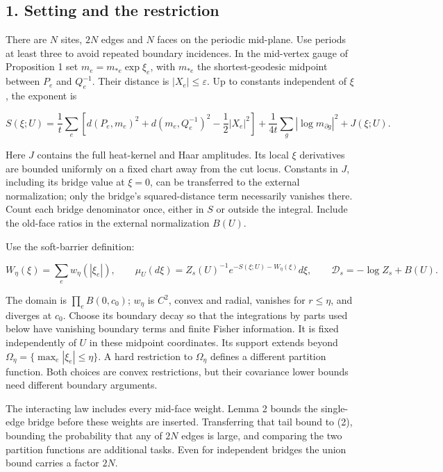 \documentclass[11pt,a4paper]{article}
\begin{document}
\hypertarget{setting-and-the-restriction}{%
\subsection{1. Setting and the
restriction}\label{setting-and-the-restriction}}

There are \(N\) sites, \(2N\) edges and \(N\) faces on the periodic
mid-plane. Use periods at least three to avoid repeated boundary
incidences. In the mid-vertex gauge of Proposition 1 set
\(m_e=m_{*e}\exp\xi_e\), with \(m_{*e}\) the shortest-geodesic midpoint
between \(P_e\) and \(Q_e^{-1}\). Their distance is
\(|X_e|\le\varepsilon\). Up to constants independent of \(\xi\), the
exponent is

\[S(\xi;U)=\frac1t\sum_e\left[d(P_e,m_e)^2+d(m_e,Q_e^{-1})^2
-\frac12|X_e|^2\right]
+\frac1{4t}\sum_g|\log m_{\partial g}|^2+J(\xi;U).\tag{1}\]

Here \(J\) contains the full heat-kernel and Haar amplitudes. Its local
\(\xi\) derivatives are bounded uniformly on a fixed chart away from the
cut locus. Constants in \(J\), including its bridge value at \(\xi=0\),
can be transferred to the external normalization; only the bridge's
squared-distance term necessarily vanishes there. Count each bridge
denominator once, either in \(S\) or outside the integral. Include the
old-face ratios in the external normalization \(B(U)\).

Use the soft-barrier definition:

\[W_\eta(\xi)=\sum_e w_\eta(|\xi_e|),\qquad
\mu_U(d\xi)=Z_s(U)^{-1}e^{-S(\xi;U)-W_\eta(\xi)}d\xi,
\qquad \mathcal D_s=-\log Z_s+B(U).\tag{2}\]

The domain is \(\prod_e B(0,c_0)\); \(w_\eta\) is \(C^2\), convex and
radial, vanishes for \(r\le\eta\), and diverges at \(c_0\). Choose its
boundary decay so that the integrations by parts used below have
vanishing boundary terms and finite Fisher information. It is fixed
independently of \(U\) in these midpoint coordinates. Its support
extends beyond \(\Omega_\eta=\{\max_e|\xi_e|\le\eta\}\). A hard
restriction to \(\Omega_\eta\) defines a different partition function.
Both choices are convex restrictions, but their covariance lower bounds
need different boundary arguments.

The interacting law includes every mid-face weight. Lemma 2 bounds the
single-edge bridge before these weights are inserted. Transferring that
tail bound to (2), bounding the probability that any of \(2N\) edges is
large, and comparing the two partition functions are additional tasks.
Even for independent bridges the union bound carries a factor \(2N\).
\end{document}
